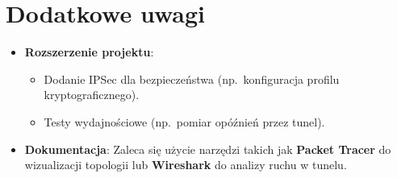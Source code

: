 \documentclass[12pt,twoside,a4paper,openany]{article}
\begin{document}
\clearpage


\section{Dodatkowe uwagi}
\begin{itemize}
    \item \textbf{Rozszerzenie projektu}:
    \begin{itemize}        \item Dodanie IPSec dla bezpieczeństwa (np.\ konfiguracja profilu kryptograficznego).
        \item Testy wydajnościowe (np.\ pomiar opóźnień przez tunel).
    \end{itemize}
    \item \textbf{Dokumentacja}: Zaleca się użycie narzędzi takich jak \textbf{Packet Tracer} do wizualizacji topologii lub \textbf{Wireshark} do analizy ruchu w tunelu.
\end{itemize}

\newpage
\printbibliography[heading=bibnumbered, label=Literatura, title=Literatura]

\newpage
\hypersetup{linkcolor=black}
\renewcommand{\cftparskip}{3pt}
\clearpage
\renewcommand{\cftloftitlefont}{\Large\bfseries\sffamily}
\listoffigures
{}
\thispagestyle{fancy}

\newpage
\renewcommand{\cftlottitlefont}{\Large\bfseries\sffamily}
\def\listtablename{Spis tabel}
\listoftables
\thispagestyle{fancy}

\newpage
\renewcommand{\cftlottitlefont}{\Large\bfseries\sffamily}
\renewcommand{\lstlistlistingname}{Spis listingów}
\lstlistoflistings
\thispagestyle{fancy}

\todos
\end{document}
